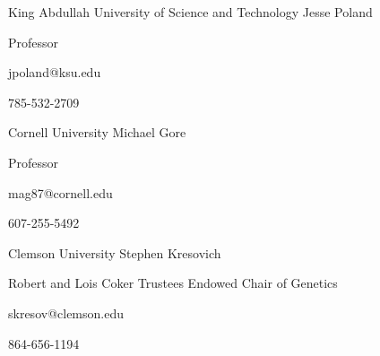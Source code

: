 
\begin{cventries}

  \cventry
    {King Abdullah University of Science and Technology} %
    {Jesse Poland} %
    {} %
    {} %
    {
      \begin{cvitems} %
        \item {Professor}
        \item {jpoland@ksu.edu}
        \item {785-532-2709}
      \end{cvitems}
    }

  \cventry
    {Cornell University} %
    {Michael Gore} %
    {} %
    {} %
    {
      \begin{cvitems} %
        \item {Professor}
        \item {mag87@cornell.edu}
        \item {607-255-5492}
      \end{cvitems}
    }

  \cventry
    {Clemson University} %
    {Stephen Kresovich} %
    {} %
    {} %
    {
      \begin{cvitems} %
        \item {Robert and Lois Coker Trustees Endowed Chair of Genetics}
        \item {skresov@clemson.edu}
        \item {864-656-1194}
      \end{cvitems}
    }



\end{cventries}
